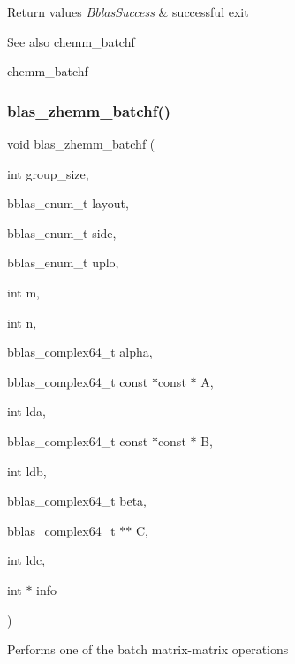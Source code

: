 \begin{DoxyRetVals}{Return values}
{\em Bblas\+Success} & successful exit\\
\hline
\end{DoxyRetVals}
\begin{DoxySeeAlso}{See also}
chemm\+\_\+batchf 

chemm\+\_\+batchf 
\end{DoxySeeAlso}
\mbox{\label{group__hemm__batchf_gaf6cd524bb78c2bab51170b200b76cfa8}} 
\subsubsection{\texorpdfstring{blas\+\_\+zhemm\+\_\+batchf()}{blas\_zhemm\_batchf()}}
{\footnotesize\ttfamily void blas\+\_\+zhemm\+\_\+batchf (\begin{DoxyParamCaption}\item[{int}]{group\+\_\+size,  }\item[{bblas\+\_\+enum\+\_\+t}]{layout,  }\item[{bblas\+\_\+enum\+\_\+t}]{side,  }\item[{bblas\+\_\+enum\+\_\+t}]{uplo,  }\item[{int}]{m,  }\item[{int}]{n,  }\item[{bblas\+\_\+complex64\+\_\+t}]{alpha,  }\item[{bblas\+\_\+complex64\+\_\+t const $\ast$const $\ast$}]{A,  }\item[{int}]{lda,  }\item[{bblas\+\_\+complex64\+\_\+t const $\ast$const $\ast$}]{B,  }\item[{int}]{ldb,  }\item[{bblas\+\_\+complex64\+\_\+t}]{beta,  }\item[{bblas\+\_\+complex64\+\_\+t $\ast$$\ast$}]{C,  }\item[{int}]{ldc,  }\item[{int $\ast$}]{info }\end{DoxyParamCaption})}

Performs one of the batch matrix-\/matrix operations

